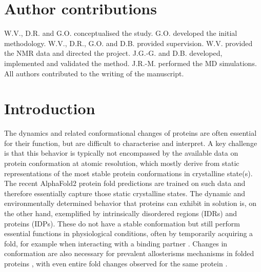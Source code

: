 \section*{Author contributions}
W.V., D.R. and G.O. conceptualised the study.
G.O. developed the initial methodology.
W.V., D.R., G.O. and D.B. provided supervision.
W.V. provided the NMR data and directed the project.
J.G.-G. and D.B. developed, implemented and validated the method.
J.R.-M. performed the MD simulations.
All authors contributed to the writing of the manuscript.

\newpage

\section{Introduction}

The dynamics and related conformational changes of proteins are often essential for their function, but are difficult to characterise and interpret. A key challenge is that this behavior is typically not encompassed by the available data on protein conformation at atomic resolution, which mostly derive from static representations of the most stable protein conformations in crystalline state(s). The recent AlphaFold2 protein fold predictions are trained on such data and therefore essentially capture those static crystalline states. The dynamic and environmentally determined behavior that proteins can exhibit in solution is, on the other hand, exemplified by intrinsically disordered regions (IDRs) and proteins (IDPs). These do not have a stable conformation but still perform essential functions in physiological conditions, often by temporarily acquiring a fold, for example when interacting with a binding partner \cite{tompa_intrinsically_2012}. Changes in conformation are also necessary for prevalent \glspl{allosterism} mechanisms in folded proteins \cite{guo_protein_2016}, with even entire fold changes observed for the same protein \cite{pirchi_single-molecule_2011}.

